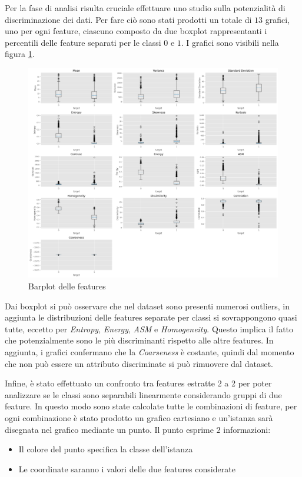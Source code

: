 Per la fase di analisi risulta cruciale effettuare uno studio sulla potenzialità
di discriminazione dei dati. Per fare ciò sono stati prodotti un totale di $13$
grafici, uno per ogni feature, ciascuno composto da due boxplot rappresentanti
i percentili delle feature separati per le classi $0$ e $1$. I grafici sono visibili
nella figura \ref{fig:boxplot_features}.
\newpage
\begin{figure}[!ht]
      \centering
      \includegraphics[width=\textwidth]{img/analisi/boxplot.png}
      \caption{Barplot delle features}
      \label{fig:boxplot_features}
\end{figure}

Dai boxplot si può osservare che nel dataset sono presenti numerosi outliers, in
aggiunta le distribuzioni delle features separate per classi si sovrappongono
quasi tutte, eccetto per \textit{Entropy}, \textit{Energy}, \textit{ASM} e
\textit{Homogeneity}. Questo implica il fatto che potenzialmente sono le più
discriminanti rispetto alle altre features. In aggiunta, i grafici confermano
che la \textit{Coarseness} è costante, quindi dal momento che non può essere un
attributo discriminate si può rimuovere dal dataset.

Infine, è stato effettuato un confronto tra features estratte 2 a 2 per poter
analizzare se le classi sono separabili linearmente considerando gruppi di due
feature. In questo modo sono state calcolate tutte le combinazioni di feature,
per ogni combinazione è stato prodotto un grafico cartesiano e un'istanza sarà
disegnata nel grafico mediante un punto. Il punto esprime $2$ informazioni:
\begin{itemize}
      \item Il colore del punto specifica la classe dell'istanza
      \item Le coordinate saranno i valori delle due features considerate
\end{itemize}


